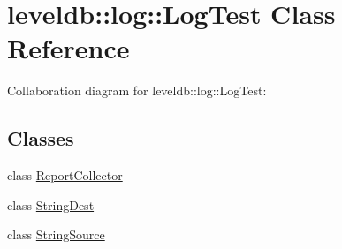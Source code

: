 \hypertarget{classleveldb_1_1log_1_1_log_test}{\section{leveldb\-:\-:log\-:\-:Log\-Test Class Reference}
\label{classleveldb_1_1log_1_1_log_test}
}


Collaboration diagram for leveldb\-:\-:log\-:\-:Log\-Test\-:
\subsection*{Classes}
\begin{DoxyCompactItemize}
\item 
class \hyperlink{classleveldb_1_1log_1_1_log_test_1_1_report_collector}{Report\-Collector}
\item 
class \hyperlink{classleveldb_1_1log_1_1_log_test_1_1_string_dest}{String\-Dest}
\item 
class \hyperlink{classleveldb_1_1log_1_1_log_test_1_1_string_source}{String\-Source}
\end{DoxyCompactItemize}
